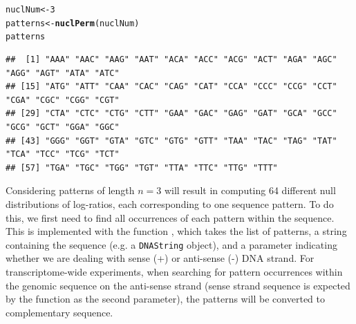 \documentclass{article}\usepackage[]{graphicx}\usepackage[usenames,dvipsnames]{color}
\makeatletter
\newcommand{\hlnum}[1]{\textcolor[rgb]{0.686,0.059,0.569}{#1}}%
\newcommand{\hlstd}[1]{\textcolor[rgb]{0.345,0.345,0.345}{#1}}%
\newcommand{\hlkwb}[1]{\textcolor[rgb]{0.69,0.353,0.396}{#1}}%
\newcommand{\hlkwd}[1]{\textcolor[rgb]{0.737,0.353,0.396}{\textbf{#1}}}%
\newenvironment{kframe}{%
 \def\at@end@of@kframe{}%
 \ifinner\ifhmode%
  \def\at@end@of@kframe{\end{minipage}}%
  \begin{minipage}{\columnwidth}%
 \fi\fi%
 \def\FrameCommand##1{\hskip\@totalleftmargin \hskip-\fboxsep
 \colorbox{shadecolor}{##1}\hskip-\fboxsep
     \hskip-\linewidth \hskip-\@totalleftmargin \hskip\columnwidth}%
 \MakeFramed {\advance\hsize-\width
   \@totalleftmargin\z@ \linewidth\hsize
   \@setminipage}}%
 {\par\unskip\endMakeFramed%
 \at@end@of@kframe}
\newenvironment{knitrout}{}{} %
\makeatother
\begin{document}
\begin{knitrout}
\color{fgcolor}\begin{kframe}
\begin{alltt}
\hlstd{nuclNum} \hlkwb{<-} \hlnum{3}
\hlstd{patterns} \hlkwb{<-} \hlkwd{nuclPerm}\hlstd{(nuclNum)}
\hlstd{patterns}
\end{alltt}
\begin{verbatim}
##  [1] "AAA" "AAC" "AAG" "AAT" "ACA" "ACC" "ACG" "ACT" "AGA" "AGC" "AGG" "AGT" "ATA" "ATC"
## [15] "ATG" "ATT" "CAA" "CAC" "CAG" "CAT" "CCA" "CCC" "CCG" "CCT" "CGA" "CGC" "CGG" "CGT"
## [29] "CTA" "CTC" "CTG" "CTT" "GAA" "GAC" "GAG" "GAT" "GCA" "GCC" "GCG" "GCT" "GGA" "GGC"
## [43] "GGG" "GGT" "GTA" "GTC" "GTG" "GTT" "TAA" "TAC" "TAG" "TAT" "TCA" "TCC" "TCG" "TCT"
## [57] "TGA" "TGC" "TGG" "TGT" "TTA" "TTC" "TTG" "TTT"
\end{verbatim}
\end{kframe}
\end{knitrout}

Considering patterns of length $n = 3$ will result in computing
64 different null distributions of log-ratios, each
corresponding to one sequence pattern. To do this, we first need to find all
occurrences of each pattern within the sequence. This is implemented with the
function , which takes the list of patterns, a string
containing the sequence (e.g. a \verb|DNAString| object), and a parameter
indicating whether we are dealing with sense (+) or anti-sense (-) DNA strand.
For transcriptome-wide experiments, when searching for pattern occurrences
within the genomic sequence on the anti-sense strand (sense strand sequence is
expected by the function as the second parameter), the patterns will be
converted to complementary sequence.
\end{document}
